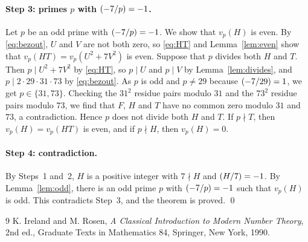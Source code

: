 \documentclass[11pt]{article}
\newcommand{\leg}[2]{\mathchoice{\biggl(\dfrac{#1}{#2}\biggr)}{(#1/#2)}{(#1/#2)}{(#1/#2)}}
\begin{document}
\paragraph{\texorpdfstring{Step 3: primes $p$ with $\leg{-7}{p}=-1$.}{Step 3: inert primes.}} Let $p$ be an odd prime with $\leg{-7}{p}=-1$. We show that $v_p(H)$ is even. By \eqref{eq:bezout}, $U$ and $V$ are not both zero, so \eqref{eq:HT} and Lemma~\ref{lem:even} show that $v_p(HT)=v_p(U^2+7V^2)$ is even. Suppose that $p$ divides both $H$ and $T$. Then $p\mid U^2+7V^2$ by \eqref{eq:HT}, so $p\mid U$ and $p\mid V$ by Lemma~\ref{lem:divides}, and $p\mid 2\cdot 29\cdot 31\cdot 73$ by \eqref{eq:bezout}. As $p$ is odd and $p\neq29$ because $\leg{-7}{29}=1$, we get $p\in\{31,73\}$. Checking the $31^2$ residue pairs modulo $31$ and the $73^2$ residue pairs modulo $73$, we find that $F$, $H$ and $T$ have no common zero modulo $31$ and $73$, a contradiction. Hence $p$ does not divide both $H$ and $T$. If $p\nmid T$, then $v_p(H)=v_p(HT)$ is even, and if $p\nmid H$, then $v_p(H)=0$.

\paragraph{Step 4: contradiction.} By Steps~1 and~2, $H$ is a positive integer with $7\nmid H$ and $\leg{H}{7}=-1$. By Lemma~\ref{lem:odd}, there is an odd prime $p$ with $\leg{-7}{p}=-1$ such that $v_p(H)$ is odd. This contradicts Step~3, and the theorem is proved.
\qed

\begin{thebibliography}{9}
 K. Ireland and M. Rosen, \emph{A Classical Introduction to Modern Number Theory}, 2nd ed., Graduate Texts in Mathematics 84, Springer, New York, 1990.
\end{thebibliography}
\end{document}

